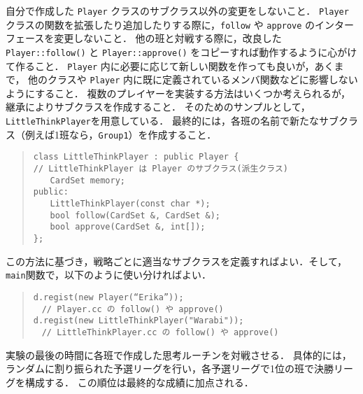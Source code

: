 自分で作成した \verb+Player+ クラスのサブクラス以外の変更をしないこと．
\verb+Player+ クラスの関数を拡張したり追加したりする際に，\verb+follow+ や \verb+approve+ のインターフェースを変更しないこと．
他の班と対戦する際に，改良した \verb+Player::follow()+ と \verb+Player::approve()+ をコピーすれば動作するように心がけて作ること． \verb+Player+ 内に必要に応じて新しい関数を作っても良いが，あくまで， 他のクラスや \verb+Player+ 内に既に定義されているメンバ関数などに影響しないようにすること．
複数のプレイヤーを実装する方法はいくつか考えられるが，
継承によりサブクラスを作成すること．
そのためのサンプルとして，\verb+LittleThinkPlayer+を用意している．
最終的には，各班の名前で新たなサブクラス（例えば1班なら，\verb+Group1+）を作成すること．
\begin{quote}
\begin{verbatim}
class LittleThinkPlayer : public Player {
// LittleThinkPlayer は Player のサブクラス(派生クラス)
　　CardSet memory;
public:
　　LittleThinkPlayer(const char *);
　　bool follow(CardSet &, CardSet &);
　　bool approve(CardSet &, int[]);
};
\end{verbatim}
\end{quote}
この方法に基づき，戦略ごとに適当なサブクラスを定義すればよい．そして，\verb+main+関数で，以下のように使い分ければよい．
\begin{quote}
\begin{verbatim}
d.regist(new Player(“Erika”)); 　
　// Player.cc の follow() や approve() 
d.regist(new LittleThinkPlayer("Warabi")); 
　// LittleThinkPlayer.cc の follow() や approve() 
\end{verbatim}
\end{quote}

実験の最後の時間に各班で作成した思考ルーチンを対戦させる．
具体的には，ランダムに割り振られた予選リーグを行い，各予選リーグで1位の班で決勝リーグを構成する．
この順位は最終的な成績に加点される．

